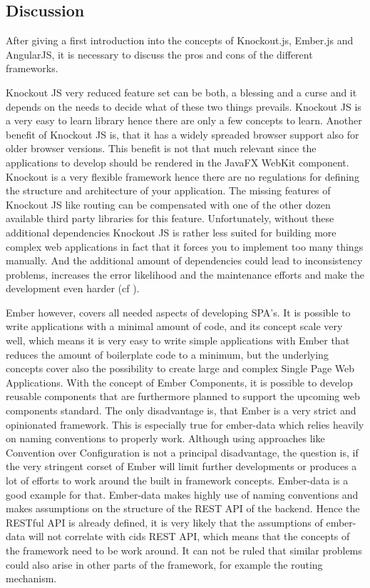 \subsection{Discussion} \label{chap:fw-discussion}


After giving a first introduction into the concepts of Knockout.js, Ember.js and AngularJS, it is necessary to discuss the pros and cons of the different frameworks.

Knockout JS very reduced feature set can be both, a blessing and a curse and it depends on the needs to decide what of these two things prevails.
Knockout JS is a very easy to learn library hence there are only a few concepts to learn.
Another benefit of Knockout JS is, that it has a widely spreaded browser support also for older browser versions.
This benefit is not that much relevant since the applications to develop should be rendered in the JavaFX WebKit component.
Knockout is a very flexible framework hence there are  no regulations for defining the structure and architecture of your application.
The missing features of Knockout JS like routing can be compensated with one of the other dozen available third party libraries for this feature.
Unfortunately, without these additional dependencies Knockout JS is rather less suited for building more complex web applications in fact that it forces you to implement too many things manually.
And the additional amount of dependencies could lead to inconsistency problems, increases the error likelihood and the maintenance efforts and make the development even harder (cf \autocite{heise_knockout}).  

Ember however, covers all needed aspects of developing SPA's.
It is possible to write applications with a minimal amount of code, and its concept scale very well, which means it is very easy to write simple applications with Ember that reduces the amount of boilerplate code to a minimum, but the underlying concepts cover also the possibility to create large and complex Single Page Web Applications. With the concept of Ember Components, it is possible to develop reusable components that are furthermore planned to support the upcoming web components standard. 
The only disadvantage is, that Ember is a very strict and opinionated framework.
This is especially true for ember-data which relies heavily on naming conventions to properly work.
Although using approaches like Convention over Configuration is not a principal disadvantage, the question is, if the very stringent corset of Ember will limit further developments or produces a lot of efforts to work around the built in framework concepts.
Ember-data is a good example for that.
Ember-data makes highly use of naming conventions and makes assumptions on the structure of the REST API of the backend. Hence the RESTful API is already defined, it is very likely that the assumptions of ember-data will not correlate with cids REST API, which means that the concepts of the framework need to be work around.
It can not be ruled that similar problems could also arise in other parts of the framework, for example the routing mechanism. 


